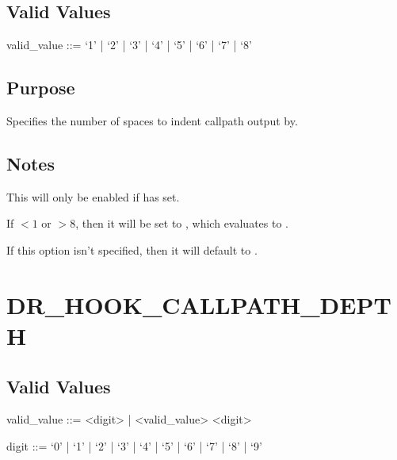 \documentclass[letterpaper,10pt,english]{sphinxmanual}
\begin{document}
\subsection{Valid Values}
\label{\detokenize{flag/flag:id255}}
\begin{DUlineblock}{0em}
\item[] valid\_value ::= ‘1’ | ‘2’ | ‘3’ | ‘4’ | ‘5’ | ‘6’ | ‘7’ | ‘8’
\end{DUlineblock}


\subsection{Purpose}
\label{\detokenize{flag/flag:id256}}
\sphinxAtStartPar
Specifies the number of spaces to indent callpath output by.


\subsection{Notes}
\label{\detokenize{flag/flag:id257}}
\sphinxAtStartPar
This will only be enabled if {\hyperref[\detokenize{flag/flag:dr-hook-opt}]{}} has  set.

\sphinxAtStartPar
If  \(< 1\) or  \(> 8\), then it will be set to , which evaluates to .

\sphinxAtStartPar
If this option isn’t specified, then it will default to .


\section{DR\_HOOK\_CALLPATH\_DEPTH}
\label{\detokenize{flag/flag:dr-hook-callpath-depth}}\label{\detokenize{flag/flag:id259}}

\subsection{Valid Values}
\label{\detokenize{flag/flag:id260}}
\begin{DUlineblock}{0em}
\item[] valid\_value ::= \textless{}digit\textgreater{} | \textless{}valid\_value\textgreater{} \textless{}digit\textgreater{}
\item[] digit ::= ‘0’ | ‘1’ | ‘2’ | ‘3’ | ‘4’ | ‘5’ | ‘6’ | ‘7’ | ‘8’ | ‘9’
\end{DUlineblock}
\end{document}
